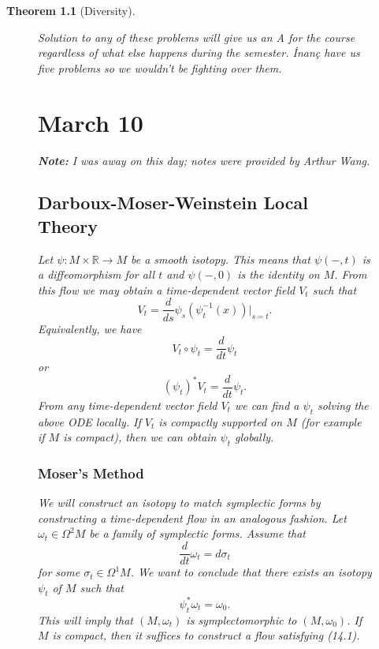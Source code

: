 \documentclass[leqno, openany]{memoir}
\newtheorem{thm}{Theorem}[chapter]
\theoremstyle{definition}
\theoremstyle{remark}
\theoremstyle{plain}
\theoremstyle{definition}
\theoremstyle{remark}
\newcommand{\R}{\mathbb{R}}
\begin{document}
\begin{thm}[Diversity]
\begin{figure}[H]
Solution to any of these problems will give us an A for the course regardless
of what else happens during the semester. \.Inan\c{c} have us five problems so
we wouldn't be fighting over them.

\chapter{March 10}%

\textbf{Note:} I was away on this day; notes were provided by Arthur Wang.

\section{Darboux-Moser-Weinstein Local Theory}%
\label{sec:darboux_moser_weinstein_local_theory}

Let $\psi: M \times \R \to M$ be a smooth isotopy. This means that $\psi(-,t)$
is a diffeomorphism for all $t$ and $\psi(-,0)$ is the identity on $M$. From
this flow we may obtain a time-dependent vector field $V_t$ such that \[ V_t =
\frac{d}{ds} \psi_s(\psi_t^{-1}(x)) \bigg\vert_{s = t}. \] Equivalently, we
have \[ V_t \circ \psi_t = \frac{d}{dt} \psi_t \] or \[ (\psi_t)^* V_t =
\frac{d}{dt} \psi_t.\] From any time-dependent vector field $V_t$ we can find a
$\psi_t$ solving the above ODE locally. If $V_t$ is compactly supported on $M$
(for example if $M$ is compact), then we can obtain $\psi_t$ globally.

\subsection{Moser's Method}%

We will construct an isotopy to match symplectic forms by constructing a
time-dependent flow in an analogous fashion. Let $\omega_t \in \Omega^2M$ be a
family of symplectic forms. Assume that \[ \frac{d}{dt} \omega_t = d \sigma_t
\] for some $\sigma_t \in \Omega^1 M$. We want to conclude that there exists an
isotopy $\psi_t$ of $M$ such that \begin{equation} \psi_t^* \omega_t =
\omega_0.  \end{equation} This will imply that $(M, \omega_t)$ is
symplectomorphic to $(M, \omega_0)$. If $M$ is compact, then it suffices to
construct a flow satisfying (14.1).


\end{figure}
\end{thm}
\end{document}
